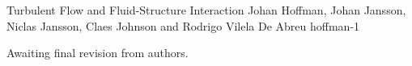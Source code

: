               {Turbulent Flow and Fluid-Structure Interaction}
              {Johan Hoffman, Johan Jansson, Niclas Jansson, Claes Johnson and Rodrigo Vilela De Abreu}
              {hoffman-1}

Awaiting final revision from authors.
